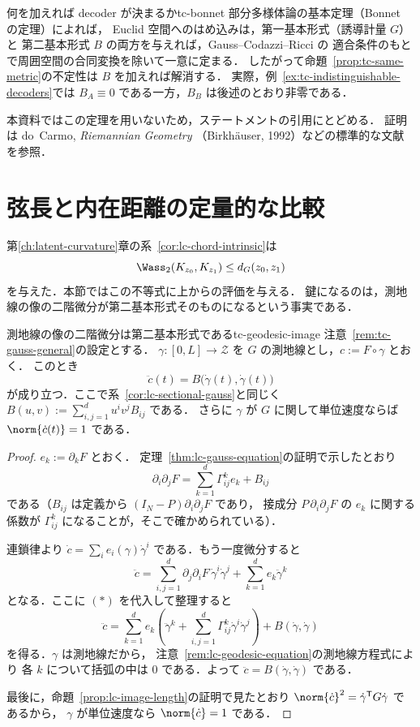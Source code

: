\begin{remark}{何を加えれば decoder が決まるか}{tc-bonnet}
  部分多様体論の基本定理（Bonnet の定理）によれば，
  Euclid 空間へのはめ込みは，第一基本形式（誘導計量 $G$）と
  第二基本形式 $B$ の両方を与えれば，Gauss--Codazzi--Ricci の
  適合条件のもとで周囲空間の合同変換を除いて一意に定まる．
  したがって命題~\ref{prop:tc-same-metric}の不定性は $B$ を加えれば解消する．
  実際，例~\ref{ex:tc-indistinguishable-decoders}では
  $B_A\equiv0$ である一方，$B_B$ は後述のとおり非零である．

  本資料ではこの定理を用いないため，ステートメントの引用にとどめる．
  証明は do~Carmo, \emph{Riemannian Geometry}
  （Birkh\"auser, 1992）などの標準的な文献を参照．
\end{remark}

\section{弦長と内在距離の定量的な比較}
\label{sec:tc-chord-vs-intrinsic}

第\ref{ch:latent-curvature}章の系~\ref{cor:lc-chord-intrinsic}は
\[
  \Wass_2(K_{z_0},K_{z_1})\leq d_G(z_0,z_1)
\]
を与えた．本節ではこの不等式に上からの評価を与える．
鍵になるのは，測地線の像の二階微分が第二基本形式そのものになるという事実である．

\begin{lemma}{測地線の像の二階微分は第二基本形式である}{tc-geodesic-image}
  注意~\ref{rem:tc-gauss-general}の設定とする．
  $\gamma\colon[0,L]\to\mathcal{Z}$ を $G$ の測地線とし，$c:=F\circ\gamma$ とおく．
  このとき
  \[
    \boxed{
      \ddot c(t)=B\bigl(\dot\gamma(t),\dot\gamma(t)\bigr)
    }
  \]
  が成り立つ．ここで系~\ref{cor:lc-sectional-gauss}と同じく
  $B(u,v):=\sum_{i,j=1}^du^iv^jB_{ij}$ である．
  さらに $\gamma$ が $G$ に関して単位速度ならば $\norm{\dot c(t)}=1$ である．
\end{lemma}

\begin{proof}
  $e_k:=\partial_kF$ とおく．
  定理~\ref{thm:lc-gauss-equation}の証明で示したとおり
  \[
    \partial_i\partial_jF
    =\sum_{k=1}^d\Gamma^k_{ij}e_k+B_{ij}
    \tag{$*$}
  \]
  である（$B_{ij}$ は定義から $(I_N-P)\partial_i\partial_jF$ であり，
  接成分 $P\,\partial_i\partial_jF$ の $e_k$ に関する係数が
  $\Gamma^k_{ij}$ になることが，そこで確かめられている）．

  連鎖律より $\dot c=\sum_ie_i(\gamma)\dot\gamma^i$ である．もう一度微分すると
  \[
    \ddot c
    =\sum_{i,j=1}^d\partial_j\partial_iF\,\dot\gamma^i\dot\gamma^j
     +\sum_{k=1}^de_k\ddot\gamma^k
  \]
  となる．ここに $(*)$ を代入して整理すると
  \[
    \ddot c
    =\sum_{k=1}^de_k
     \left(
       \ddot\gamma^k+\sum_{i,j=1}^d\Gamma^k_{ij}\dot\gamma^i\dot\gamma^j
     \right)
     +B(\dot\gamma,\dot\gamma)
  \]
  を得る．$\gamma$ は測地線だから，
  注意~\ref{rem:lc-geodesic-equation}の測地線方程式により
  各 $k$ について括弧の中は $0$ である．よって
  $\ddot c=B(\dot\gamma,\dot\gamma)$ である．

  最後に，命題~\ref{prop:lc-image-length}の証明で見たとおり
  $\norm{\dot c}^2=\dot\gamma^{\mathsf T}G\dot\gamma$ であるから，
  $\gamma$ が単位速度なら $\norm{\dot c}=1$ である．
\end{proof}

